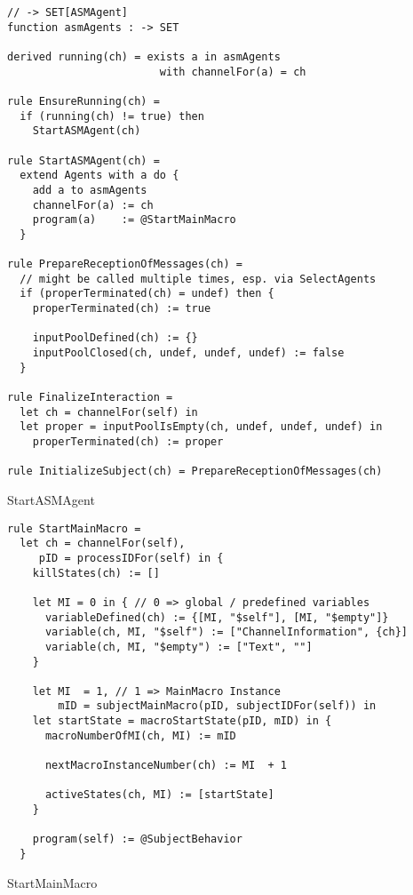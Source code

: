 \begin{listing}[H]
\begin{verbatim}
// -> SET[ASMAgent]
function asmAgents : -> SET

derived running(ch) = exists a in asmAgents
                        with channelFor(a) = ch

rule EnsureRunning(ch) =
  if (running(ch) != true) then
    StartASMAgent(ch)

rule StartASMAgent(ch) =
  extend Agents with a do {
    add a to asmAgents
    channelFor(a) := ch
    program(a)    := @StartMainMacro
  }

rule PrepareReceptionOfMessages(ch) =
  // might be called multiple times, esp. via SelectAgents
  if (properTerminated(ch) = undef) then {
    properTerminated(ch) := true

    inputPoolDefined(ch) := {}
    inputPoolClosed(ch, undef, undef, undef) := false
  }

rule FinalizeInteraction =
  let ch = channelFor(self) in
  let proper = inputPoolIsEmpty(ch, undef, undef, undef) in
    properTerminated(ch) := proper

rule InitializeSubject(ch) = PrepareReceptionOfMessages(ch)
\end{verbatim}
\caption{StartASMAgent}
\label{lst:asm:StartASMAgent}
\end{listing}




\begin{listing}[H]
\begin{verbatim}
rule StartMainMacro =
  let ch = channelFor(self),
     pID = processIDFor(self) in {
    killStates(ch) := []

    let MI = 0 in { // 0 => global / predefined variables
      variableDefined(ch) := {[MI, "$self"], [MI, "$empty"]}
      variable(ch, MI, "$self") := ["ChannelInformation", {ch}]
      variable(ch, MI, "$empty") := ["Text", ""]
    }

    let MI  = 1, // 1 => MainMacro Instance
        mID = subjectMainMacro(pID, subjectIDFor(self)) in
    let startState = macroStartState(pID, mID) in {
      macroNumberOfMI(ch, MI) := mID

      nextMacroInstanceNumber(ch) := MI  + 1

      activeStates(ch, MI) := [startState]
    }

    program(self) := @SubjectBehavior
  }
\end{verbatim}
\caption{StartMainMacro}
\label{lst:asm:StartMainMacro}
\end{listing}




